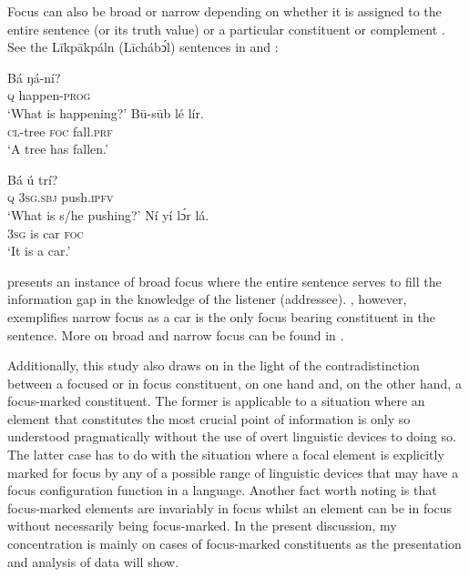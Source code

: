 \documentclass[output=paper,colorlinks,citecolor=brown]{langscibook}
\begin{document}
Focus can also be broad or narrow depending on whether it is assigned to the entire sentence (or its truth value) or a particular constituent or complement \citep[44]{Dik1981}. See the Līkpākpáln (Līchábͻ́l) sentences in  and :

\ea%
    \label{ex:bisilki:6}
    \ea\label{ex:bisilki:6a}
    \gll    Bá	ŋá-ní?\\
            \textsc{q}	happen\textsc{-prog}\\
    \glt    ‘What is happening?’
    \ex\label{ex:bisilki:6b}
    \gll    Bū-sūb	lé	lír.\\
            \textsc{cl-}tree		\textsc{foc}	fall\textsc{.prf}\\
    \glt    ‘A tree has fallen.’
    \z
\z

\ea%
    \label{ex:bisilki:7}
    \ea\label{ex:bisilki:7a}
    \gll    Bá	ú		trí?\\
            \textsc{q}	\textsc{3sg.sbj}	push\textsc{.ipfv}\\
    \glt    ‘What is s/he pushing?’
    \ex\label{ex:bisilki:7b}
    \gll    Ní	yí	lɔ́r	lá.\\
            \textsc{3sg}	is	car	\textsc{foc}\\
    \glt    ‘It is a car.’
    \z
\z

 presents an instance of broad focus where the entire sentence serves to fill the information gap in the knowledge of the listener (addressee). , however, exemplifies narrow focus as a car is the only focus bearing constituent in the sentence. More on broad and narrow focus can be found in \citet[96--97]{Hyman2010}.

Additionally, this study also draws on \citet[93]{VanPutten2016} in the light of the contradistinction between a focused or in focus constituent, on one hand and, on the other hand, a focus-marked constituent. The former is applicable to a situation where an element that constitutes the most crucial point of information is only so understood pragmatically without the use of overt linguistic devices to doing so. The latter case has to do with the situation where a focal element is explicitly marked for focus by any of a possible range of linguistic devices that may have a focus configuration function in a language. Another fact worth noting is that focus-marked elements are invariably in focus whilst an element can be in focus without necessarily being focus-marked. In the present discussion, my concentration is mainly on cases of focus-marked constituents as the presentation and analysis of data will show.
\end{document}

